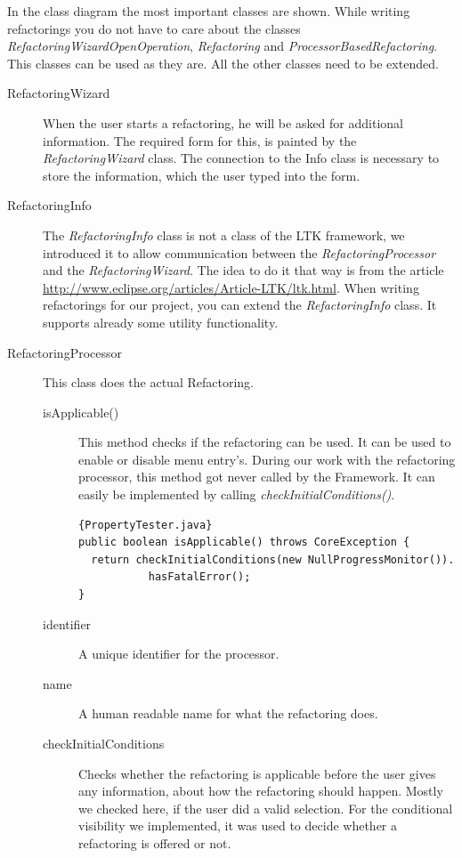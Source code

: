 \documentclass[a4paper,10pt]{report}
\begin{document}
In the class diagram the most important classes are shown.
While writing refactorings you do not have to care about the classes {\it RefactoringWizardOpenOperation}, {\it Refactoring} and {\it ProcessorBasedRefactoring}.
This classes can be used as they are. All the other classes need to be extended.
\begin{description}
 \item[RefactoringWizard] When the user starts a refactoring, he will be asked for additional information.
The required form for this, is painted by the {\it RefactoringWizard} class.
The connection to the Info class is necessary to store the information, which the user typed into the form. 
 \item[RefactoringInfo] The {\it RefactoringInfo} class is not a class of the LTK framework,
we introduced it to allow communication between the {\it RefactoringProcessor} and the {\it RefactoringWizard}. 
The idea to do it that way is from the article \href{http://www.eclipse.org/articles/Article-LTK/ltk.html}{http://www.eclipse.org/articles/Article-LTK/ltk.html}.
When writing refactorings for our project, you can extend the {\it RefactoringInfo} class. It supports already some utility functionality.
 \item[RefactoringProcessor] This class does the actual Refactoring. 
\begin{description}
 \item[isApplicable()] This method checks if the refactoring can be used. It can be used to enable or disable menu entry's.
During our work with the refactoring processor, this method got never called by the Framework.
It can easily be implemented by calling {\it checkInitialConditions()}.
\begin{lstlisting}[caption=Generic isApplicable Implementation]{PropertyTester.java}
public boolean isApplicable() throws CoreException {
  return checkInitialConditions(new NullProgressMonitor()).
           hasFatalError();
}
\end{lstlisting}
\item[identifier] A unique identifier for the processor.
\item[name] A human readable name for what the refactoring does.
\item[checkInitialConditions] Checks whether the refactoring is applicable before the user gives any information, about how the refactoring should happen.
Mostly we checked here, if the user did a valid selection. For the conditional visibility we implemented, it was used to decide whether a refactoring is offered or not.

\end{description}
\end{description}
\end{document}
